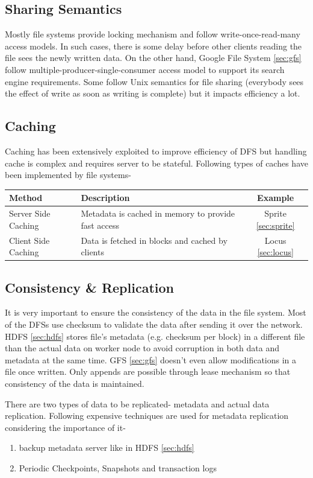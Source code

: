 \documentclass[a4paper,12pt]{article}
\begin{document}
\subsection{Sharing Semantics}
Mostly file systems provide locking mechanism and follow write-once-read-many access models. In such cases, there is some delay before other clients reading the file sees the newly written data.  On the other hand, Google File System \ref{sec:gfs} follow multiple-producer-single-consumer access model to support its search engine requirements. Some follow Unix semantics for file sharing (everybody sees the effect of write as soon as writing is complete) but it impacts efficiency a lot.

\subsection{Caching}
Caching has been extensively exploited to improve efficiency of DFS but handling cache is complex and requires server to be stateful. Following types of caches have been implemented by file systems-
\begin{table}[h]
\begin{tabular}{|p{3cm}|p{8cm}|c|}
\hline 
\textbf{Method} & \textbf{Description} & \textbf{Example} \\ 
\hline 
Server Side Caching & Metadata is cached in memory to provide fast access & Sprite \ref{sec:sprite}\\
\hline
Client Side Caching & Data is fetched in blocks and cached by clients & Locus \ref{sec:locus} \\
\hline 
\end{tabular} 
\end{table}

\subsection{Consistency \& Replication}
It is very important to ensure the consistency of the data in the file system. Most of the DFSs use checksum to validate the data after sending it over the network. HDFS \ref{sec:hdfs} stores file's metadata (e.g. checksum per block) in a different file than the actual data on worker node to avoid corruption in both data and metadata at the same time.  GFS \ref{sec:gfs} doesn't even allow modifications in a file once written. Only appends are possible through lease mechanism so that consistency of the data is maintained.

There are two types of data to be replicated- metadata and actual data replication. Following expensive techniques are used for metadata replication considering the importance of it-
\begin{enumerate}
\item backup metadata server like in HDFS \ref{sec:hdfs}
\item Periodic Checkpoints, Snapshots and transaction logs
\end{enumerate}
\end{document}
